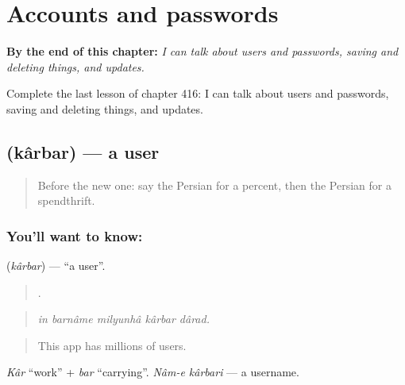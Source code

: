 
\chapter{Accounts and passwords}
\label{ch:fa-accounts-and-passwords}

\begin{chapteropening}
\textbf{By the end of this chapter:} \emph{I can talk about users and passwords, saving and deleting things, and updates.}

Complete the last lesson of chapter 416: I can talk about users and passwords, saving and deleting things, and updates.
\end{chapteropening}

\section[\texorpdfstring{\fa{کاربر} (kârbar)}{کاربر (kârbar)}]{ (kârbar) — a user}

\label{lesson:FA-C416-karbar}



\begin{quote}
Before the new one: say the Persian for a percent, then the Persian for a spendthrift.
\end{quote}

\subsection*{You'll want to know: }
\textbf{} (\emph{kârbar}) — \textquotedblleft{}a user\textquotedblright{}.

\begin{quote}
    .
\end{quote}

\begin{quote}
\emph{in barnâme milyunhâ kârbar dârad.}
\end{quote}

\begin{quote}
This app has millions of users.
\end{quote}

\emph{Kâr} \textquotedblleft{}work\textquotedblright{} + \emph{bar} \textquotedblleft{}carrying\textquotedblright{}. \emph{Nâm-e kârbari} — a username.


